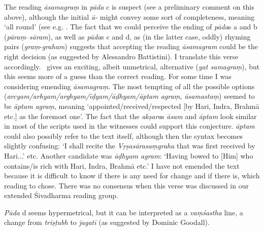 {{  The reading \textit{āsamagraṃ} in \textit{pāda} c is suspect 
  {\rm (}see a preliminary comment on this above{\rm )},
  although the initial \textit{ā-} might convey some sort of
  completeness, meaning `all round'
  {\rm (}see e.g. .
  The fact that we could perceive the ending of \textit{pāda}s a and b 
  {\rm (}\textit{pāraṃ}--\textit{sāram}{\rm )}, as well as \textit{pāda}s c and d, as {\rm (}in the 
  latter case, oddly{\rm )} rhyming pairs {\rm (}\textit{graṃ}-\textit{graham}{\rm )}
  suggests that accepting the reading \textit{āsamagram} could be 
  the right decision {\rm (}as suggested by Alessandro Battistini{\rm )}.
  I translate this verse accordingly. \msM\ gives an exciting,
  albeit unmetrical, alternative {\rm (}\textit{yat samagraṃ}{\rm )}, but
  this seems more of a guess than the correct reading.
  For some time I was considering emending \textit{āsamagraṃ}.
  The most tempting of all the possible options 
  {\rm (}\textit{arcyam/arhyam/arghyam/īḍyam/āḍhyam/āptam agraṃ, āsamastaṃ}{\rm )} 
  seemed to be \textit{āptam agraṃ},
  meaning `appointed/received/respected [by Hari, Indra,
  Brahmā etc.] as the foremost one'. The fact that 
  the \textit{akṣara}s \textit{āsam} and \textit{āptam} look similar in most
  of the scripts used in the witnesses could support this
  conjecture. \textit{āptam} could also
  possibly refer to the text itself, although then the
  syntax becomes slightly confusing: `I shall recite the
  \textit{Vṛṣasārasaṃgraha} that was first received by Hari...' etc.
  Another candidate was \textit{āḍhyam agram}:
  `Having bowed to [Him] who contains/is rich with Hari, Indra, Brahmā
  etc.' I have not emended the text because it is difficult
  to know if there is any need for change and if there is, which reading 
  to chose. There was no consensus when this verse was discussed 
  in our extended Śivadharma reading group.
 
  
 
  \textit{Pāda} d seems hypermetrical, but it can be interpreted as a \textit{vaṃśastha}
  line, a change from \textit{triṣṭubh} to \textit{jagatī} {\rm (}as suggested by Dominic Goodall{\rm )}.
 }}




